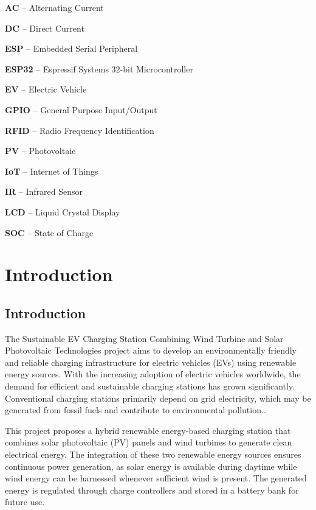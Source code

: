 \documentclass[12pt]{report}
\begin{document}
\begin{Certificatepage}
\begin{center}
\begin{justify}
    \item \textbf{AC} – Alternating Current
    \item \textbf{DC} – Direct Current
    \item \textbf{ESP} – Embedded Serial Peripheral
    \item \textbf{ESP32} – Espressif Systems 32-bit Microcontroller
    \item \textbf{EV} – Electric Vehicle
    \item \textbf{GPIO} – General Purpose Input/Output
    \item \textbf{RFID} – Radio Frequency Identification
    \item \textbf{PV} – Photovoltaic
    \item \textbf{IoT} – Internet of Things
    \item \textbf{IR} – Infrared Sensor
    \item \textbf{LCD} – Liquid Crystal Display
    \item \textbf{SOC} – State of Charge
     
\newpage

\chapter{Introduction}


\section{Introduction}

\setlength{\parindent}{} %

The Sustainable EV Charging Station Combining Wind Turbine and Solar Photovoltaic Technologies project aims to develop an environmentally friendly and reliable charging infrastructure for electric vehicles (EVs) using renewable energy sources. With the increasing adoption of electric vehicles worldwide, the demand for efficient and sustainable charging stations has grown significantly. Conventional charging stations primarily depend on grid electricity, which may be generated from fossil fuels and contribute to environmental pollution..

\vspace{10pt} %

This project proposes a hybrid renewable energy-based charging station that combines solar photovoltaic (PV) panels and wind turbines to generate clean electrical energy. The integration of these two renewable energy sources ensures continuous power generation, as solar energy is available during daytime while wind energy can be harnessed whenever sufficient wind is present. The generated energy is regulated through charge controllers and stored in a battery bank for future use.


\end{justify}
\end{center}
\end{Certificatepage}
\end{document}
